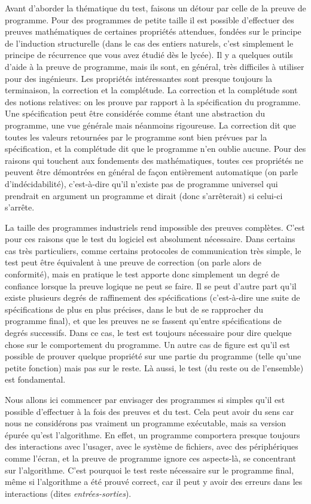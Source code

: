 \documentclass[11pt,a4paper]{article}
\begin{document}
Avant d'aborder la thématique du test, faisons un détour par celle de
la preuve de programme. Pour des programmes de petite taille il est
possible d'effectuer des preuves mathématiques de certaines propriétés
attendues, fondées sur le principe de l'induction structurelle (dans
le cas des entiers naturels, c'est simplement le principe de
récurrence que vous avez étudié dès le lycée). Il y a quelques outils
d'aide à la preuve de programme, mais ils sont, en général, très
difficiles à utiliser pour des ingénieurs. Les propriétés
intéressantes sont presque toujours la terminaison, la correction et
la complétude. La correction et la complétude sont des notions
relatives: on les prouve par rapport à la spécification du
programme. Une spécification peut être considérée comme étant une
abstraction du programme, une vue générale mais néanmoins
rigoureuse. La correction dit que toutes les valeurs retournées par le
programme sont bien prévues par la spécification, et la complétude dit
que le programme n'en oublie aucune. Pour des raisons qui touchent aux
fondements des mathématiques, toutes ces propriétés ne peuvent être
démontrées en général de façon entièrement automatique (on parle
d'indécidabilité), c'est-à-dire qu'il n'existe pas de programme
universel qui prendrait en argument un programme et dirait (donc
s'arrêterait) si celui-ci s'arrête.

La taille des programmes industriels rend impossible des preuves
complètes. C'est pour ces raisons que le test du logiciel est
absolument nécessaire. Dans certains cas très particuliers, comme
certains protocoles de communication très simple, le test peut être
équivalent à une preuve de correction (on parle alors de conformité),
mais en pratique le test apporte donc simplement un degré de confiance
lorsque la preuve logique ne peut se faire. Il se peut d'autre part
qu'il existe plusieurs degrés de raffinement des spécifications
(c'est-à-dire une suite de spécifications de plus en plus précises,
dans le but de se rapprocher du programme final), et que les preuves
ne se fassent qu'entre spécifications de degrés successifs. Dans ce
cas, le test est toujours nécessaire pour dire quelque chose sur le
comportement du programme. Un autre cas de figure est qu'il est
possible de prouver quelque propriété sur une partie du programme
(telle qu'une petite fonction) mais pas sur le reste. Là aussi, le
test (du reste ou de l'ensemble) est fondamental.

Nous allons ici commencer par envisager des programmes si simples
qu'il est possible d'effectuer à la fois des preuves et du test. Cela
peut avoir du sens car nous ne considérons pas vraiment un programme
exécutable, mais sa version épurée qu'est l'algorithme. En effet, un
programme comportera presque toujours des interactions avec l'usager,
avec le système de fichiers, avec des périphériques comme l'écran, et
la preuve de programme ignore ces aspects-là, se concentrant sur
l'algorithme. C'est pourquoi le test reste nécessaire sur le programme
final, même si l'algorithme a été prouvé correct, car il peut y avoir
des erreurs dans les interactions (dites \emph{entrées-sorties}).
\end{document}
